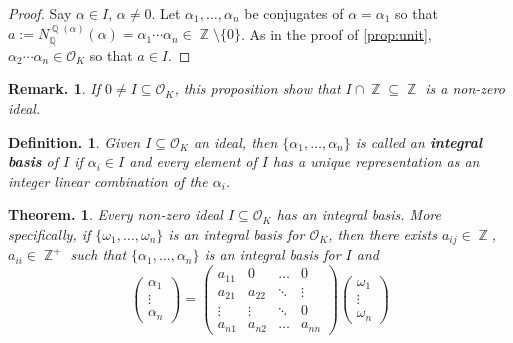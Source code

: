 \documentclass[11pt, a4paper]{memoir}
\DeclareMathOperator{\Q}{{\mathbb{Q}}}
\DeclareMathOperator{\Z}{{\mathbb{Z}}}
\theoremstyle{change}
\newtheorem{theorem}{Theorem.}[section]
\theoremstyle{plain}
\theoremstyle{nonumberplain}
\newtheorem{definition}{Definition.}
\newtheorem{remark}{Remark.}
\newtheorem{proof}{Proof}
\newcommand{\mbf}[1]{{\boldmath\bfseries #1}}
\numberwithin{equation}{section}
\begin{document}
\begin{proof}
    Say $\alpha\in I$, $\alpha\neq 0$.
    Let $\alpha_1,\ldots,\alpha_n$ be conjugates of $\alpha=\alpha_1$ so that $a:=N_{\Q}^{\Q(\alpha)}(\alpha)=\alpha_1\cdots\alpha_n\in\Z\setminus\{0\}$.
    As in the proof of \cref{prop:unit}, $\alpha_2\cdots\alpha_n\in\mathcal{O}_K$ so that $a\in I$.
\end{proof}
\begin{remark}
    If $0\neq I\subseteq\mathcal{O}_K$, this proposition show that $I\cap\Z\subseteq\Z$ is a non-zero ideal.
\end{remark}
\begin{definition}
    Given $I\subseteq\mathcal{O}_K$ an ideal, then $\{\alpha_1,\ldots,\alpha_n\}$ is called an \mbf{integral basis} of $I$ if $\alpha_i\in I$ and every element of $I$ has a unique representation as an integer linear combination of the $\alpha_i$.
\end{definition}
\begin{theorem}\label{thm:id-basis}
    Every non-zero ideal $I\subseteq\mathcal{O}_K$ has an integral basis.
    More specifically, if $\{\omega_1,\ldots,\omega_n\}$ is an integral basis for $\mathcal{O}_K$, then there exists $a_{ij}\in\Z$, $a_{ii}\in\Z^+$ such that $\{\alpha_1,\ldots,\alpha_n\}$ is an integral basis for $I$ and
    \begin{equation*}
        \begin{pmatrix}
            \alpha_1\\\vdots\\\alpha_n
        \end{pmatrix}
        =
        \begin{pmatrix}
            a_{11}&0&\hdots&0\\
            a_{21}&a_{22}&\ddots&\vdots\\
            \vdots&\vdots&\ddots&0\\
            a_{n1}&a_{n2}&\hdots&a_{nn}
        \end{pmatrix}
        \begin{pmatrix}
            \omega_1\\\vdots\\\omega_n
        \end{pmatrix}
    \end{equation*}
\end{theorem}
\end{document}
